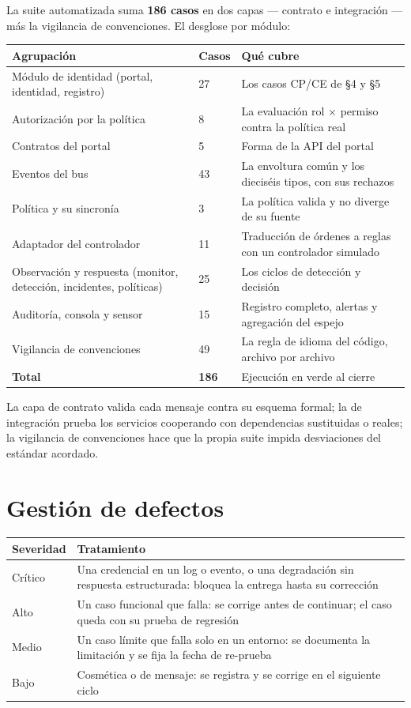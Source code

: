 \documentclass[11pt,a4paper]{article}
\begin{document}
La suite automatizada suma \textbf{186 casos} en dos capas --- contrato e integración --- más la vigilancia de convenciones. El desglose por módulo:

\begin{longtable}{p{5.6cm}p{2.4cm}p{6.0cm}}
\toprule
\textbf{Agrupación} & \textbf{Casos} & \textbf{Qué cubre}\\
\midrule
Módulo de identidad (portal, identidad, registro) & 27 & Los casos CP/CE de §4 y §5\\
Autorización por la política & 8 & La evaluación rol $\times$ permiso contra la política real\\
Contratos del portal & 5 & Forma de la API del portal\\
Eventos del bus & 43 & La envoltura común y los dieciséis tipos, con sus rechazos\\
Política y su sincronía & 3 & La política valida y no diverge de su fuente\\
Adaptador del controlador & 11 & Traducción de órdenes a reglas con un controlador simulado\\
Observación y respuesta (monitor, detección, incidentes, políticas) & 25 & Los ciclos de detección y decisión\\
Auditoría, consola y sensor & 15 & Registro completo, alertas y agregación del espejo\\
Vigilancia de convenciones & 49 & La regla de idioma del código, archivo por archivo\\
\textbf{Total} & \textbf{186} & Ejecución en verde al cierre\\
\bottomrule
\end{longtable}

La capa de contrato valida cada mensaje contra su esquema formal; la de integración prueba los servicios cooperando con dependencias sustituidas o reales; la vigilancia de convenciones hace que la propia suite impida desviaciones del estándar acordado.

\section{Gestión de defectos}

\begin{longtable}{p{3.2cm}p{10.8cm}}
\toprule
\textbf{Severidad} & \textbf{Tratamiento}\\
\midrule
Crítico & Una credencial en un log o evento, o una degradación sin respuesta estructurada: bloquea la entrega hasta su corrección\\
Alto & Un caso funcional que falla: se corrige antes de continuar; el caso queda con su prueba de regresión\\
Medio & Un caso límite que falla solo en un entorno: se documenta la limitación y se fija la fecha de re-prueba\\
Bajo & Cosmética o de mensaje: se registra y se corrige en el siguiente ciclo\\
\bottomrule
\end{longtable}
\end{document}
